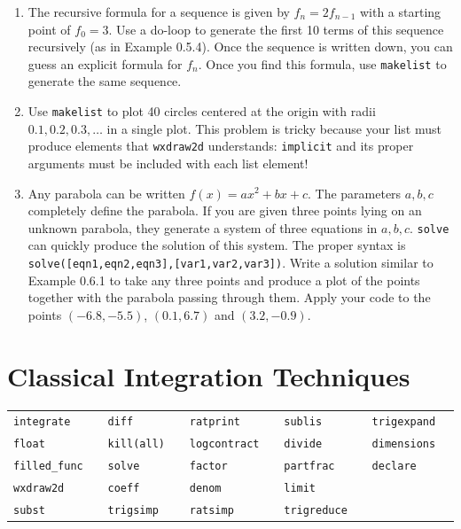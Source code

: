 \documentclass[10.5pt,twoside]{report}
\theoremstyle{definition}
\begin{document}
\begin{enumerate}
\item  The recursive formula for a sequence is given by $f_n=2f_{n-1}$ with a starting point of $f_0=3$.  Use a do-loop to generate the first 10 terms of this sequence recursively (as in Example 0.5.4).  Once the sequence is written down, you can guess an explicit formula for $f_n$.  Once you find this formula, use \verb|makelist| to generate the same sequence.

\item Use \verb|makelist| to plot 40 circles centered at the origin with radii $0.1,0.2,0.3,\dots$ in a single plot.  This problem is tricky because your list must produce elements that \verb|wxdraw2d| understands:  \verb|implicit| and its proper arguments must be included with each list element!

\item Any parabola can be written $f(x)=ax^2+bx+c$.  The parameters $a,b,c$ completely define the parabola.  If you are given three points lying on an unknown parabola, they generate a system of three equations in $a,b,c$.  \verb|solve| can quickly produce the solution of this system.  The proper syntax is \verb|solve([eqn1,eqn2,eqn3],[var1,var2,var3])|.  Write a solution similar to Example 0.6.1 to take any three points and produce a plot of the points together with the parabola passing through them.  Apply your code to the points $(-6.8,-5.5)$, $(0.1,6.7)$ and $(3.2,-0.9)$.



\end{enumerate}





\chapter{Classical Integration Techniques}

\vspace*{\fill}

\minitoc

\vspace*{\fill}


\newline
\newline

\begin{tabular}{l l l l l}
 \verb|integrate   |   &\verb|diff   |   &\verb|ratprint   |  &\verb|sublis   |   &\verb|trigexpand   |\\
 \verb|float  |   &\verb|kill(all)   |   &\verb|logcontract   |  &\verb|divide  |   &\verb|dimensions   |\\
 \verb|filled_func   |   &\verb|solve   |   &\verb|factor   |  &\verb|partfrac   |   &\verb|declare   |\\
 \verb|wxdraw2d    |   &\verb|coeff   |   &\verb|denom   |   &\verb|limit   |  &\verb|   |\\
 \verb|subst   |   &\verb|trigsimp   |   &\verb|ratsimp   |   &\verb|trigreduce   |  &\verb|   |\\
\end{tabular}
\end{document}
